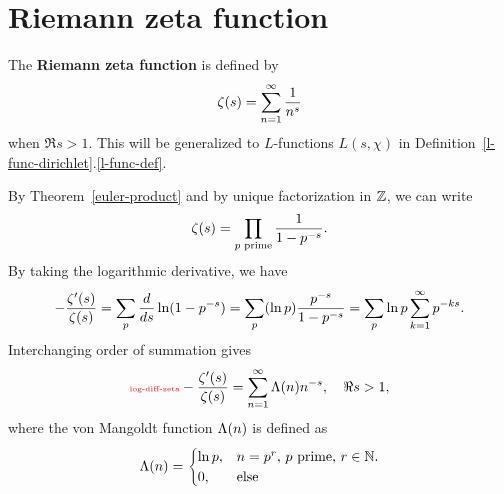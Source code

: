 \section{Riemann zeta function}
\begin{df}
The \textbf{Riemann zeta function} is defined by %
\[
\zeta(s)=\sum_{n=1}^{\infty} \frac{1}{n^s}
\]
when $\Re s>1$. This will be generalized to $L$-functions $L(s,\chi)$ in Definition~\ref{l-func-dirichlet}.\ref{l-func-def}.
\end{df}
By Theorem~\ref{euler-product} and by unique factorization in $\mathbb{Z}$, we can write
\[
\zeta(s)=\prod_{p\text{ prime}}\frac{1}{1-p^{-s}}.
\]
By taking the logarithmic derivative, we have %
\[
-\frac{\zeta'(s)}{\zeta(s)}=\sum_p \frac{d}{ds}\ln(1-p^{-s})
=\sum_p (\ln p)\frac{p^{-s}}{1-p^{-s}}=\sum_p \ln p\sum_{k=1}^{\infty} p^{-ks}.
\]
Interchanging order of summation gives
\begin{equation}\llabel{log-diff-zeta}
-\frac{\zeta'(s)}{\zeta(s)}=\sum_{n=1}^{\iy} \La(n)n^{-s}, \quad \Re s>1,
\end{equation}
where the von Mangoldt function $\Lambda(n)$ is defined as
\[
\Lambda(n)=\begin{cases}
\ln p,&n=p^r,\,p\text{ prime, }r\in \mathbb{N}.\\
0,&\text{else}
\end{cases}
\]

